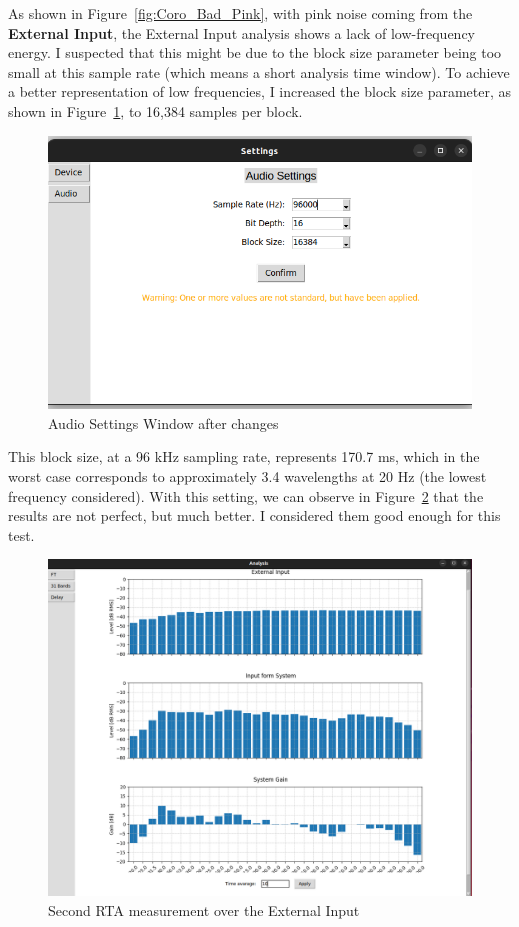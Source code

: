 As shown in Figure~\ref{fig:Coro_Bad_Pink}, with pink noise coming from the \textbf{External Input}, the External Input analysis shows a lack of low-frequency energy. I suspected that this might be due to the block size parameter being too small at this sample rate (which means a short analysis time window). To achieve a better representation of low frequencies, I increased the block size parameter, as shown in Figure~\ref{fig:Coro_audio_settings}, to 16,384 samples per block.

\begin{figure}[H]
	\centering
	\includegraphics[width=0.8
	\linewidth]{Figures/Coro_audio_settings.png}
	\caption{Audio Settings Window after changes}
	\label{fig:Coro_audio_settings}
\end{figure}

This block size, at a 96 kHz sampling rate, represents 170.7 ms, which in the worst case corresponds to approximately 3.4 wavelengths at 20 Hz (the lowest frequency considered). With this  setting, we can observe in Figure~\ref{fig:Coro_Good_Pink} that the results are not perfect, but much better. I considered them good enough for this test.

\begin{figure}[H]
	\centering
	\includegraphics[width=0.8
	\linewidth]{Figures/Coro_Pink_Good.png}
	\caption{Second RTA measurement over the External Input}
	\label{fig:Coro_Good_Pink}
\end{figure}

